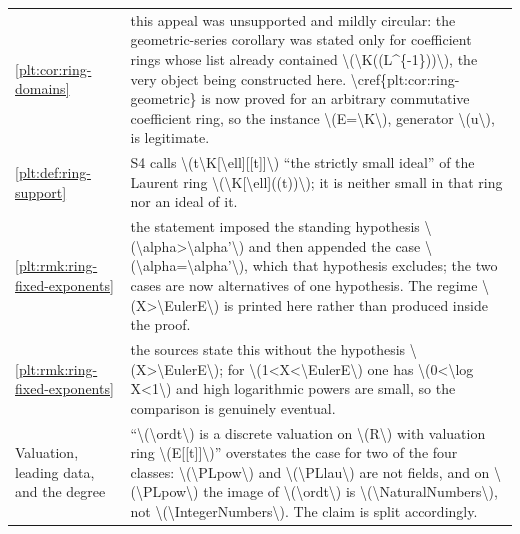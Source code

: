 \documentclass[11pt,oneside]{article}
\theoremstyle{plain}
\theoremstyle{definition}
\theoremstyle{remark}
\begin{document}
\begin{longtable}{@{}p{} p{}@{}}
\cref{plt:cor:ring-domains} & this appeal was unsupported and mildly circular: the geometric-series corollary was stated only for coefficient rings whose list already contained \textbackslash (\textbackslash K((L\textasciicircum \{-1\}))\textbackslash ), the very object being constructed here. \textbackslash cref\{plt:cor:ring-geometric\} is now proved for an arbitrary commutative coefficient ring, so the instance \textbackslash (E=\textbackslash K\textbackslash ), generator \textbackslash (u\textbackslash ), is legitimate.\\
\cref{plt:def:ring-support} & S4 calls \textbackslash (t\textbackslash K[\textbackslash ell][[t]]\textbackslash ) ``the strictly small ideal'' of the Laurent ring \textbackslash (\textbackslash K[\textbackslash ell]((t))\textbackslash ); it is neither small in that ring nor an ideal of it.\\
\cref{plt:rmk:ring-fixed-exponents} & the statement imposed the standing hypothesis \textbackslash (\textbackslash alpha>\textbackslash alpha'\textbackslash ) and then appended the case \textbackslash (\textbackslash alpha=\textbackslash alpha'\textbackslash ), which that hypothesis excludes; the two cases are now alternatives of one hypothesis. The regime \textbackslash (X>\textbackslash EulerE\textbackslash ) is printed here rather than produced inside the proof.\\
\cref{plt:rmk:ring-fixed-exponents} & the sources state this without the hypothesis \textbackslash (X>\textbackslash EulerE\textbackslash ); for \textbackslash (1<X<\textbackslash EulerE\textbackslash ) one has \textbackslash (0<\textbackslash log X<1\textbackslash ) and high logarithmic powers are small, so the comparison is genuinely eventual.\\
Valuation, leading data, and the degree  & ``\textbackslash (\textbackslash ordt\textbackslash ) is a discrete valuation on \textbackslash (R\textbackslash ) with valuation ring \textbackslash (E[[t]]\textbackslash )'' overstates the case for two of the four classes: \textbackslash (\textbackslash PLpow\textbackslash ) and \textbackslash (\textbackslash PLlau\textbackslash ) are not fields, and on \textbackslash (\textbackslash PLpow\textbackslash ) the image of \textbackslash (\textbackslash ordt\textbackslash ) is \textbackslash (\textbackslash NaturalNumbers\textbackslash ), not \textbackslash (\textbackslash IntegerNumbers\textbackslash ). The claim is split accordingly.\\

\end{longtable}
\end{document}
